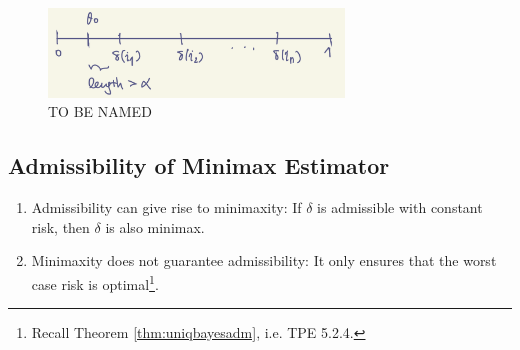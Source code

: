 \begin{figure}[htpb]
    \centering
    \includegraphics[width=0.7\textwidth]{figures/0-1loss.png}
    \caption{TO BE NAMED}
    \label{fig:01loss}
\end{figure}

\subsection{Admissibility of Minimax Estimator}

\begin{enumerate}
    \item Admissibility can give rise to minimaxity: 
    If $\delta$ is admissible with constant risk, 
    then $\delta$ is also minimax.
    \item Minimaxity does not guarantee admissibility: 
    It only ensures that the worst case risk is optimal\footnote{Recall Theorem \ref{thm:uniqbayesadm}, i.e. TPE 5.2.4.}.
\end{enumerate}

